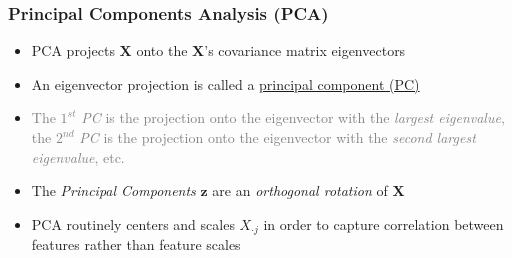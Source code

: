 \documentclass[xcolor={dvipsnames}]{beamer}
\begin{document}
\frame
{
\frametitle{Principal Components Analysis (PCA)}


\begin{itemize}
\item PCA projects ${\boldsymbol X}$ onto the ${\boldsymbol X}$'s covariance matrix eigenvectors
\item An eigenvector projection is called a \underline{principal component (PC)} 
\item \textcolor{gray}{The $1^{st}$ \emph{PC}  is the projection onto the eigenvector with the \emph{largest eigenvalue},
the  $2^{nd}$ \emph{PC} is the projection onto the eigenvector with the \emph{second largest eigenvalue}, etc.}

\item<2-> The \emph{Principal Components} ${\boldsymbol z}$ are an \emph{orthogonal rotation} of ${\boldsymbol X}$
\end{itemize}


\vspace{-.75em}
\begin{itemize}
\item<3->  \textcolor{NavyBlue}{PCA routinely centers and scales $X_{\cdot j}$ in order to capture correlation between features rather than feature scales}
\end{itemize}

}
 
\end{document}
